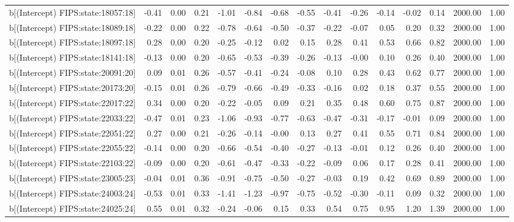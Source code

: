 \begin{table}[ht]
\begin{tabular}{rrrrrrrrrrrrrrr}
  b[(Intercept) FIPS:state:18057:18] & -0.41 & 0.00 & 0.21 & -1.01 & -0.84 & -0.68 & -0.55 & -0.41 & -0.26 & -0.14 & -0.02 & 0.14 & 2000.00 & 1.00 \\ 
  b[(Intercept) FIPS:state:18089:18] & -0.22 & 0.00 & 0.22 & -0.78 & -0.64 & -0.50 & -0.37 & -0.22 & -0.07 & 0.05 & 0.20 & 0.32 & 2000.00 & 1.00 \\ 
  b[(Intercept) FIPS:state:18097:18] & 0.28 & 0.00 & 0.20 & -0.25 & -0.12 & 0.02 & 0.15 & 0.28 & 0.41 & 0.53 & 0.66 & 0.82 & 2000.00 & 1.00 \\ 
  b[(Intercept) FIPS:state:18141:18] & -0.13 & 0.00 & 0.20 & -0.65 & -0.53 & -0.39 & -0.26 & -0.13 & -0.00 & 0.10 & 0.26 & 0.40 & 2000.00 & 1.00 \\ 
  b[(Intercept) FIPS:state:20091:20] & 0.09 & 0.01 & 0.26 & -0.57 & -0.41 & -0.24 & -0.08 & 0.10 & 0.28 & 0.43 & 0.62 & 0.77 & 2000.00 & 1.00 \\ 
  b[(Intercept) FIPS:state:20173:20] & -0.15 & 0.01 & 0.26 & -0.79 & -0.66 & -0.49 & -0.33 & -0.16 & 0.02 & 0.18 & 0.37 & 0.55 & 2000.00 & 1.00 \\ 
  b[(Intercept) FIPS:state:22017:22] & 0.34 & 0.00 & 0.20 & -0.22 & -0.05 & 0.09 & 0.21 & 0.35 & 0.48 & 0.60 & 0.75 & 0.87 & 2000.00 & 1.00 \\ 
  b[(Intercept) FIPS:state:22033:22] & -0.47 & 0.01 & 0.23 & -1.06 & -0.93 & -0.77 & -0.63 & -0.47 & -0.31 & -0.17 & -0.01 & 0.09 & 2000.00 & 1.00 \\ 
  b[(Intercept) FIPS:state:22051:22] & 0.27 & 0.00 & 0.21 & -0.26 & -0.14 & -0.00 & 0.13 & 0.27 & 0.41 & 0.55 & 0.71 & 0.84 & 2000.00 & 1.00 \\ 
  b[(Intercept) FIPS:state:22055:22] & -0.14 & 0.00 & 0.20 & -0.66 & -0.54 & -0.40 & -0.27 & -0.13 & -0.01 & 0.12 & 0.26 & 0.40 & 2000.00 & 1.00 \\ 
  b[(Intercept) FIPS:state:22103:22] & -0.09 & 0.00 & 0.20 & -0.61 & -0.47 & -0.33 & -0.22 & -0.09 & 0.06 & 0.17 & 0.28 & 0.41 & 2000.00 & 1.00 \\ 
  b[(Intercept) FIPS:state:23005:23] & -0.04 & 0.01 & 0.36 & -0.91 & -0.75 & -0.50 & -0.27 & -0.03 & 0.19 & 0.42 & 0.69 & 0.89 & 2000.00 & 1.00 \\ 
  b[(Intercept) FIPS:state:24003:24] & -0.53 & 0.01 & 0.33 & -1.41 & -1.23 & -0.97 & -0.75 & -0.52 & -0.30 & -0.11 & 0.09 & 0.32 & 2000.00 & 1.00 \\ 
  b[(Intercept) FIPS:state:24025:24] & 0.55 & 0.01 & 0.32 & -0.24 & -0.06 & 0.15 & 0.33 & 0.54 & 0.75 & 0.95 & 1.20 & 1.39 & 2000.00 & 1.00 \\ 

\end{tabular}
\end{table}
